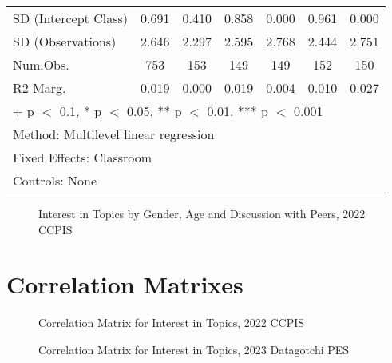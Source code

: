 \documentclass[
  letterpaper,
  DIV=11,
  numbers=noendperiod]{scrreprt}
\begin{document}
\begin{table}
\begin{tabular}[t]{lcccccc}
\hspace{1em}SD (Intercept Class) & 0.691 & 0.410 & 0.858 & 0.000 & 0.961 & 0.000\\
\hspace{1em}SD (Observations) & 2.646 & 2.297 & 2.595 & 2.768 & 2.444 & 2.751\\
\hspace{1em}Num.Obs. & 753 & 153 & 149 & 149 & 152 & 150\\
\hspace{1em}R2 Marg. & 0.019 & 0.000 & 0.019 & 0.004 & 0.010 & 0.027\\
\bottomrule
\multicolumn{7}{l}{\rule{0pt}{1em}+ p $<$ 0.1, * p $<$ 0.05, ** p $<$ 0.01, *** p $<$ 0.001}\\
\multicolumn{7}{l}{\rule{0pt}{1em}Method: Multilevel linear regression}\\
\multicolumn{7}{l}{\rule{0pt}{1em}Fixed Effects: Classroom}\\
\multicolumn{7}{l}{\rule{0pt}{1em}Controls: None}\\
\end{tabular}
\end{table}

\begin{figure}


\caption{\label{fig-discusspeersyo}Interest in Topics by Gender, Age and
Discussion with Peers, 2022 CCPIS}

\end{figure}%

\chapter{Correlation Matrixes}\label{sec-appendix8}

\begin{figure}


\caption{\label{fig-corccpis}Correlation Matrix for Interest in Topics,
2022 CCPIS}

\end{figure}%

\begin{figure}


\caption{\label{fig-cordg}Correlation Matrix for Interest in Topics,
2023 Datagotchi PES}

\end{figure}%
\end{document}
